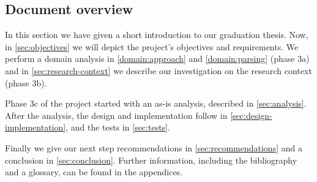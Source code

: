 
\subsection{Document overview}
In this section we have given a short introduction to our graduation thesis.
Now, in \autoref{sec:objectives} we will depict the project's objectives and requirements.
We perform a domain analysis in \autoref{domain:approach} and \autoref{domain:parsing} (phase 3a) and in \autoref{sec:research-context} we describe our investigation on the research context (phase 3b).

Phase 3c of the project started with an as-is analysis, described in \autoref{sec:analysis}.
After the analysis, the design and implementation follow in \autoref{sec:design-implementation}, and the tests in \autoref{sec:tests}.

Finally we give our next step recommendations in \autoref{sec:recommendations} and a conclusion in \autoref{sec:conclusion}.
Further information, including the bibliography and a glossary, can be found in the appendices.